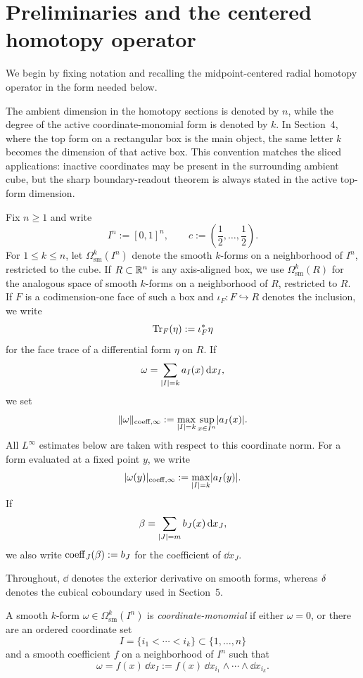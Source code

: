 \section{Preliminaries and the centered homotopy operator}

We begin by fixing notation and recalling the midpoint-centered radial
homotopy operator in the form needed below.

The ambient dimension in the homotopy sections is denoted by $n$, while the
degree of the active coordinate-monomial form is denoted by $k$. In Section~4,
where the top form on a rectangular box is the main object, the same letter $k$
becomes the dimension of that active box. This convention matches the sliced
applications: inactive coordinates may be present in the surrounding ambient
cube, but the sharp boundary-readout theorem is always stated in the active
top-form dimension.

Fix $n\ge 1$ and write
\[
I^n:=[0,1]^n,
\qquad
c:=\left(\frac12,\dots,\frac12\right).
\]
For $1\le k\le n$, let $\Omega^k_{\mathrm{sm}}(I^n)$ denote the smooth
$k$-forms on a neighborhood of $I^n$, restricted to the cube. If
$R\subset\mathbb{R}^n$ is any axis-aligned box, we use $\Omega^k_{\mathrm{sm}}(R)$ for
the analogous space of smooth $k$-forms on a neighborhood of $R$, restricted
to $R$. If $F$ is a codimension-one face of such a box and
$\iota_F:F\hookrightarrow R$ denotes the inclusion, we write
\[
\operatorname{Tr}_F(\eta):=\iota_F^\ast\eta
\]
for the face trace of a differential form $\eta$ on $R$. If
\[
\omega=\sum_{\lvert I \rvert=k} a_I(x)\,\mathrm{d} x_I,
\]
we set
\[
\lVert \omega \rVert_{\mathrm{coeff},\infty}:=
\max_{\lvert I \rvert=k}\sup_{x\in I^n}\lvert a_I(x) \rvert.
\]
All $L^\infty$ estimates below are taken with respect to this coordinate norm.
For a form evaluated at a fixed point $y$, we write
\[
\lvert \omega(y) \rvert_{\mathrm{coeff},\infty}:=
\max_{\lvert I \rvert=k}\lvert a_I(y) \rvert.
\]
If
\[
\beta=\sum_{\lvert J \rvert=m} b_J(x)\,\mathrm{d} x_J,
\]
we also write $\mathrm{coeff}_J(\beta):=b_J$ for the coefficient of $\dd x_J$.

\begin{remark}
Throughout, $\dd$ denotes the exterior derivative on smooth forms, whereas
$\delta$ denotes the cubical coboundary used in Section~5.
\end{remark}

\begin{definition}
\label{def:decomposable-form}
A smooth $k$-form $\omega\in\Omega^k_{\mathrm{sm}}(I^n)$ is
\emph{coordinate-monomial} if either $\omega=0$, or there are an ordered
coordinate set
\[
I=\{i_1<\cdots<i_k\}\subset\{1,\dots,n\}
\]
and a smooth coefficient $f$ on a neighborhood of $I^n$ such that
\[
\omega=f(x)\,\dd x_I
:=
f(x)\,\dd x_{i_1}\wedge\cdots\wedge \dd x_{i_k}.
\]
\end{definition}

